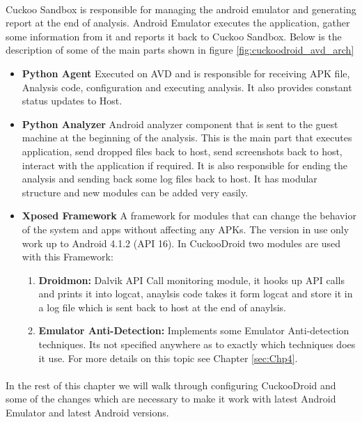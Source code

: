 \documentclass[../main.tex]{subfile}
\begin{document}
		\paragraph{} Cuckoo Sandbox is responsible for managing the android emulator and generating report at the end of analysis. Android Emulator executes the application, gather some information from it and reports it back to Cuckoo Sandbox. Below is the description of some of the main parts shown in figure \ref{fig:cuckoodroid_avd_arch}
		\begin{itemize}
			\item \textbf{Python Agent} Executed on AVD and is responsible for receiving APK file, Analysis code, configuration and executing analysis. It also provides constant status updates to Host.
			\item \textbf{Python Analyzer} Android analyzer component that is sent to the guest machine at the beginning of the analysis. This is the main part that executes application, send dropped files back to host, send screenshots back to host, interact with the application if required. It is also responsible for ending the analysis and sending back some log files back to host. It has modular structure and new modules can be added very easily.
			\item \textbf{Xposed Framework} A framework for modules that can change the behavior of the system and apps without affecting any APKs. The version in use only work up to Android 4.1.2 (API 16). In CuckooDroid two modules are used with this Framework:
			\begin{enumerate}

				\item \textbf{Droidmon:} Dalvik  API Call monitoring module, it hooks up API calls and prints it into logcat, anaylsis code takes it form logcat and store it in a log file which is sent back to host at the end of anaylsis.
				\item \textbf{Emulator Anti-Detection:} Implements some Emulator Anti-detection techniques. Its not specified anywhere as to exactly which techniques does it use. For more details on this topic see Chapter \ref{sec:Chp4}.
			\end{enumerate}
		\end{itemize}
		\paragraph{} In the rest of this chapter we will walk through configuring CuckooDroid and some of the changes which are necessary to make it work with latest Android Emulator and latest Android versions.
\end{document}
